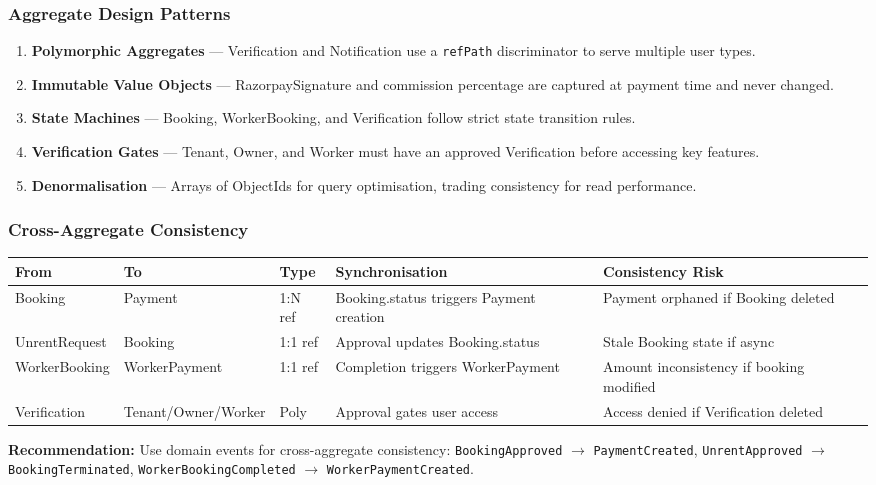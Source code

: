 \documentclass[12pt,a4paper]{article}
\begin{document}
\vspace{1em}

\subsubsection*{Aggregate Design Patterns}

\begin{enumerate}
  \item \textbf{Polymorphic Aggregates} — Verification and Notification use a \texttt{refPath} discriminator to serve multiple user types.
  \item \textbf{Immutable Value Objects} — RazorpaySignature and commission percentage are captured at payment time and never changed.
  \item \textbf{State Machines} — Booking, WorkerBooking, and Verification follow strict state transition rules.
  \item \textbf{Verification Gates} — Tenant, Owner, and Worker must have an approved Verification before accessing key features.
  \item \textbf{Denormalisation} — Arrays of ObjectIds for query optimisation, trading consistency for read performance.
\end{enumerate}

\subsubsection*{Cross-Aggregate Consistency}

\begin{center}
\begin{tabular}{@{}p{2.5cm}p{2.5cm}p{1.5cm}p{3.5cm}p{3.5cm}@{}}
\toprule
\textbf{From} & \textbf{To} & \textbf{Type} & \textbf{Synchronisation} & \textbf{Consistency Risk} \\
\midrule
Booking & Payment & 1:N ref & Booking.status triggers Payment creation & Payment orphaned if Booking deleted \\
UnrentRequest & Booking & 1:1 ref & Approval updates Booking.status & Stale Booking state if async \\
WorkerBooking & WorkerPayment & 1:1 ref & Completion triggers WorkerPayment & Amount inconsistency if booking modified \\
Verification & Tenant/Owner/Worker & Poly & Approval gates user access & Access denied if Verification deleted \\
\bottomrule
\end{tabular}
\end{center}

\vspace{0.5em}

\textbf{Recommendation:} Use domain events for cross-aggregate consistency: \texttt{BookingApproved} $\rightarrow$ \texttt{PaymentCreated}, \texttt{UnrentApproved} $\rightarrow$ \texttt{BookingTerminated}, \texttt{WorkerBookingCompleted} $\rightarrow$ \texttt{WorkerPaymentCreated}.
\end{document}
